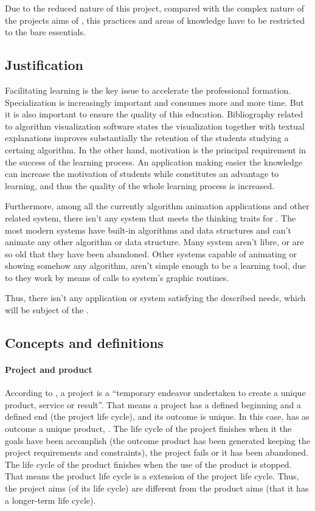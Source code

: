 \documentclass[twocolumn]{article}
\begin{document}
Due to the reduced nature of this project, compared with the complex
nature of the projects aims of \pmbok, this practices and areas of
knowledge have to be restricted to the bare essentials.

\subsection{Justification}
Facilitating learning is the key issue to accelerate the professional
formation. Specialization is increasingly important and consumes more
and more time. But it is also important to ensure the quality of this
education. Bibliography related to algorithm visualization
software states the visualization together with textual explanations
improves substantially the retention of the students studying a
certaing algorithm. In the other hand, motivation is the
principal requirement in the success of the learning process. An
application making easier the knowledge can increase the motivation of
students while constitutes an advantage to learning, and thus the
quality of the whole learning process is increased.

Furthermore, among all the currently algorithm animation applications
and other related system, there isn't any system that meets the
thinking traits for \fav. The most modern systems have built-in
algorithms and data structures and can't animate any other algorithm
or data structure. Many system aren't libre, or are so old that they
have been abandoned. Other systems capable of animating or showing
somehow any algorithm, aren't simple enough to be a learning tool, due
to they work by means of calls to system's graphic routines.

Thus, there isn't any application or system satisfying the
described needs, which will be subject of the \favp.

\subsection{Concepts and definitions}
\paragraph{Project and product}
According to \pmbok, a project is a ``temporary endeavor undertaken to
create a unique product, service or result''. That means a project has
a defined beginning and a defined end (the project life cycle), and its outcome
is unique. In this case, \favp has as outcome a unique product,
\fav. The life cycle of the project finishes when it the goals have
been accomplish (the outcome product has been generated keeping the
project requirements and constraints), the project fails or it has
been abandoned. The life cycle of the product finishes when the use of
the product is stopped. That means the product life cycle is a
extension of the project life cycle. Thus, the project aims (of its
life cycle) are different from the product aims (that it has a
longer-term life cycle).
\end{document}

